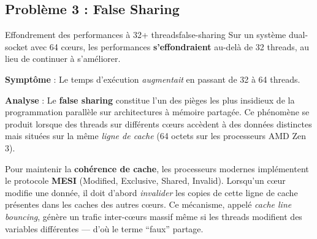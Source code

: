\documentclass[12pt,a4paper,twoside]{report}
\begin{document}
\subsection{Problème 3 : False Sharing}

\begin{probleme}{Effondrement des performances à 32+ threads}{false-sharing}
Sur un système dual-socket avec 64 cœurs, les performances \textbf{s'effondraient} au-delà de 32 threads, au lieu de continuer à s'améliorer.

\textbf{Symptôme} : Le temps d'exécution \emph{augmentait} en passant de 32 à 64 threads.
\end{probleme}

\textbf{Analyse} : Le \textbf{false sharing} constitue l'un des pièges les plus insidieux de la programmation parallèle sur architectures à mémoire partagée. Ce phénomène se produit lorsque des threads sur différents cœurs accèdent à des données distinctes mais situées sur la même \textit{ligne de cache} (64 octets sur les processeurs AMD Zen 3).

Pour maintenir la \textbf{cohérence de cache}, les processeurs modernes implémentent le protocole \textbf{MESI} (Modified, Exclusive, Shared, Invalid). Lorsqu'un cœur modifie une donnée, il doit d'abord \textit{invalider} les copies de cette ligne de cache présentes dans les caches des autres cœurs. Ce mécanisme, appelé \textit{cache line bouncing}, génère un trafic inter-cœurs massif même si les threads modifient des variables différentes --- d'où le terme ``faux'' partage.
\end{document}
